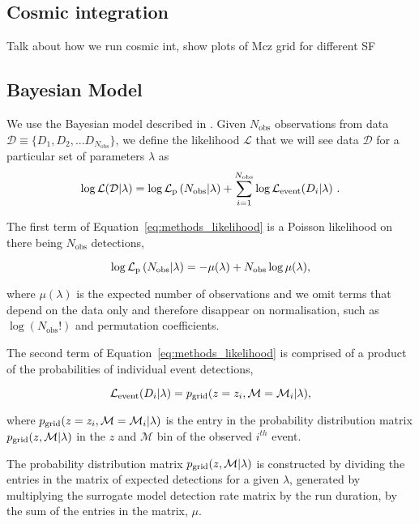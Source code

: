 \documentclass[twocolumn]{aastex631}
\newcommand{\Lmain}{\ensuremath{\mathcal{L}(\mathcal{D}|\lambda)}\xspace}
\newcommand{\Lp}{\ensuremath{\mathcal{L}_{\rm p}}\xspace}
\newcommand{\Le}{\ensuremath{\mathcal{L}_{\rm event}}\xspace}
\newcommand{\pg}{\ensuremath{p_{\rm grid}}\xspace}
\begin{document}
\subsection{Cosmic integration}
Talk about how we run cosmic int,
show plots of Mcz grid for different SF

\subsection{Bayesian Model}
We use the Bayesian model described in \citep{Riley:2023:ApJ}.
Given $N_{\mathrm{obs}}$ observations from data  $\mathcal{D} \equiv \{D_1, D_2, ... D_{N_{\mathrm{obs}}}\}$, we define the likelihood $\mathcal{L}$ that we will see data $\mathcal{D}$ for a particular set of parameters $\lambda$ as
\begin{equation}
  \log{\Lmain} = \log{\Lp\left(N_{\mathrm{obs}}|\lambda\right)} +
  \sum_{i=1}^{N_\mathrm{obs}} \log{\Le(D_i|\lambda)}\ .
  \label{eq:methods_likelihood}
\end{equation}

\bigskip
The first term of Equation~\ref{eq:methods_likelihood} is a Poisson likelihood on there being $N_\mathrm{obs}$ detections,

\begin{equation}
  \log{ \Lp\left(N_{\mathrm{obs}}|\lambda\right)} = - \mu(\lambda) + N_{\mathrm{obs}}\log\mu(\lambda) ,
  \label{eq:methods_likelihood_term1}
\end{equation}

\bigskip\noindent
where $\mu(\lambda)$ is the expected number of observations and we omit terms that depend on the data only and therefore disappear on normalisation, such as $\log(N_{\mathrm{obs}}!)$ and permutation coefficients.

The second term of Equation~\ref{eq:methods_likelihood} is comprised of a product of the probabilities of individual event detections,

\begin{equation}
  \Le(D_i|\lambda) = \pg(z=z_i,\mathcal{M}=\mathcal{M}_{i}|\lambda),
  \label{eq:methods_likelihood_term2}
\end{equation}

\bigskip\noindent
where $\pg(z=z_i,\mathcal{M}=\mathcal{M}_{i}|\lambda)$ is the entry in the probability distribution matrix $\pg(z,\mathcal{M}|\lambda)$ in the $z$ and $\mathcal{M}$ bin of the observed $i^{th}$ event.

The probability distribution matrix $\pg(z,\mathcal{M}|\lambda)$ is constructed by dividing the entries in the matrix of expected detections for a given $\lambda$, generated by multiplying the surrogate model detection rate matrix by the run duration, by the sum of the entries in the matrix, $\mu$.
\end{document}
